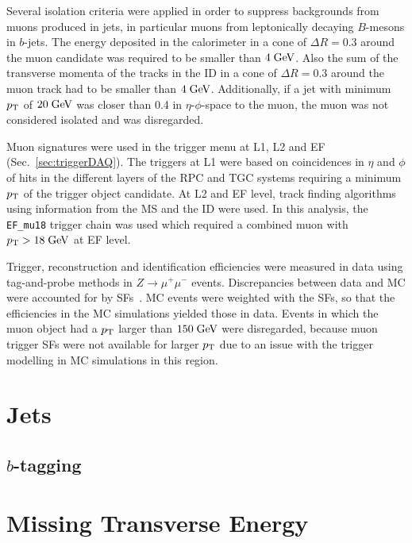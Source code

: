 Several isolation criteria were applied in order to suppress backgrounds from muons produced in jets, in particular muons from leptonically decaying
$B$-mesons in $b$-jets.
The energy deposited in the calorimeter in a cone of \mbox{$\Delta R = 0.3$} around the muon candidate was required to be smaller than \mbox{$4 \; \mathrm{GeV}$}.
Also the sum of the transverse momenta of the tracks in the ID in a cone of \mbox{$\Delta R = 0.3$} around the muon track had to be smaller than \mbox{$4 \; \mathrm{GeV}$}.
Additionally, if a jet with minimum $p_{\mathrm{T}}$ of \mbox{$20 \; \mathrm{GeV}$} was closer than 0.4 in $\eta$-$\phi$-space to the muon, the muon was not considered isolated
and was disregarded.

Muon signatures were used in the trigger menu at L1, L2 and EF (Sec.~\ref{sec:triggerDAQ}).
The triggers at L1 were based on coincidences in $\eta$ and $\phi$ of hits in the different layers of the RPC and TGC systems requiring a minimum
$p_{\mathrm{T}}$ of the trigger object candidate.
At L2 and EF level, track finding algorithms using information from the MS and the ID were used.
In this analysis, the \texttt{EF\_mu18} trigger chain was used which required a combined muon with \mbox{$p_{\mathrm{T}} > 18 \; \mathrm{GeV}$} at EF level.

Trigger, reconstruction and identification efficiencies were measured in data using tag-and-probe methods in \mbox{$Z \to \mu^+\mu^-$} events.
Discrepancies between data and MC were accounted for by SFs~\cite{muonPerf}.
MC events were weighted with the SFs, so that the efficiencies in the MC simulations yielded those in data.
Events in which the muon object had a $p_{\mathrm{T}}$ larger than \mbox{$150 \; \mathrm{GeV}$} were disregarded, because muon trigger SFs were not available for larger
$p_{\mathrm{T}}$ due to an issue with the trigger modelling in MC simulations in this region.



\section{Jets}
\label{sec:jets}

\subsection{$b$-tagging}
\label{sec:btag}

\section{Missing Transverse Energy}
\label{sec:met}
